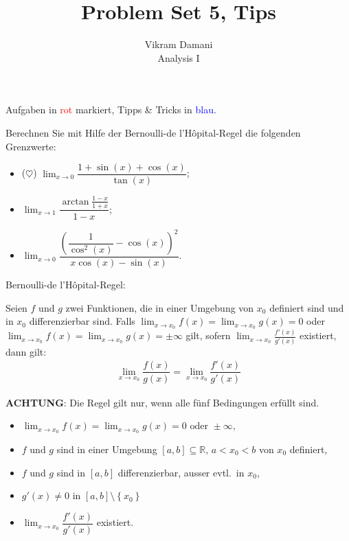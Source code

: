 \documentclass[12pt]{article}
\newcommand{\R}{\mathbb{R}} %
\newenvironment{definition}[2][Definition]{\begin{trivlist}
        \item[\hskip \labelsep {\bfseries #1}\hskip \labelsep {\bfseries #2.}]}{\flushright{$\square$}\end{trivlist}}
\newenvironment{problem}[2][\textcolor{blue}{Tipps \& Tricks zu}]{\begin{trivlist}
        \item[\hskip \labelsep {\bfseries #1}\hskip \labelsep {\bfseries \textcolor{blue}{#2}.}]}{\end{trivlist}}
\newenvironment{question}[2][\textcolor{red}{Aufgabe}]{\begin{trivlist}
        \item[\hskip \labelsep {\bfseries \textcolor{red}{#1}}\hskip \labelsep {\bfseries \textcolor{red}{#2}.}]}{\end{trivlist}}
\begin{document}
\title{Problem Set 5, Tips}
\author{Vikram Damani\\
    Analysis I}

\maketitle
Aufgaben in \textcolor{red}{rot} markiert, Tipps \& Tricks in \textcolor{blue}{blau}.

\begin{question}{1}
    Berechnen Sie mit Hilfe der Bernoulli-de l'Hôpital-Regel die folgenden Grenzwerte:
    \begin{itemize}
        \item[(a)] ($\heartsuit$) $\lim_{x\to0}\dfrac{1+\sin(x)+\cos(x)}{\tan(x)}$;
        \item[(b)] $\lim_{x\to1}\dfrac{\arctan\frac{1-x}{1+x}}{1-x}$;
        \item[(c)] $\lim_{x\to0}\dfrac{\left(\dfrac{1}{\cos^2(x)}-\cos(x)\right)^2}{x\cos(x)-\sin(x)}.$
    \end{itemize}
\end{question}

\begin{problem}{1}
Bernoulli-de l'Hôpital-Regel:
\begin{definition}{[Bernoulli-de l'Hôpital-Regel]}
    Seien $f$ und $g$ zwei Funktionen, die in einer Umgebung von $x_0$ definiert sind und in $x_0$ differenzierbar sind.
    Falls $\lim_{x\to x_0}f(x)=\lim_{x\to x_0}g(x)=0$ oder $\lim_{x\to x_0}f(x)=\lim_{x\to x_0}g(x)=\pm\infty$ gilt, sofern
    $\lim_{x\to x_0}\frac{f'(x)}{g'(x)}$ existiert, dann gilt:
    \begin{align*}
        \lim_{x\to x_0}\dfrac{f(x)}{g(x)}=\lim_{x\to x_0}\dfrac{f'(x)}{g'(x)}
    \end{align*}
\end{definition}
\textbf{ACHTUNG}: Die Regel gilt nur, wenn alle fünf Bedingungen erfüllt sind.
\begin{itemize}
    \item $\lim_{x\to x_0}f(x)=\lim_{x\to{x_0}}g(x)=0 \text{ oder } \pm\infty$,
    \item $f \text{ und } g$ sind in einer Umgebung $[a,b]\subseteq\R, \, a<x_0<b$ von $x_0$ definiert,
    \item $f$ und $g$ sind in $[a,b]$ differenzierbar, ausser evtl.\ in $x_0$,
    \item $g'(x)\neq0$ in $[a,b]\setminus\left\{x_0\right\}$
    \item $\lim_{x\to x_0}\dfrac{f'(x)}{g'(x)}$ existiert.
\end{itemize}
\end{problem}
\end{document}
